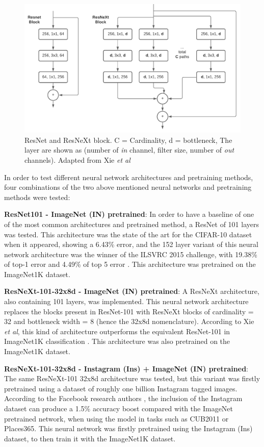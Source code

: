\documentclass[10pt,onecolumn,titlepage,letterpaper]{article}
\begin{document}
\begin{figure}[h]
	\begin{center}
		\includegraphics[width=0.75\linewidth]{resnet_resnext_block.pdf}
	\end{center}
	\caption{ResNet and ResNeXt block. C = Cardinality, d = bottleneck, The layer are shown as (number of \textit{in} channel, filter size, number of \textit{out} channels). Adapted from Xie \textit{et al} \cite{Xie2017}}
	\label{fig:resnet}
\end{figure}

In order to test different neural network architectures and pretraining methods, four combinations of the two above mentioned neural networks and pretraining methods were tested:

\textbf{ResNet101 - ImageNet (IN) pretrained}: In order to have a baseline of one of the most common architectures and pretrained method, a ResNet of 101 layers was tested. This architecture was the state of the art for the CIFAR-10 dataset when it appeared, showing a 6.43\% error, and the 152 layer variant of this neural network architecture was the winner of the ILSVRC 2015 challenge, with 19.38\% of top-1 error and 4.49\% of top 5 error \cite{He2016}. This architecture was pretrained on the ImageNet1K dataset.

\textbf{ResNeXt-101-32x8d - ImageNet (IN) pretrained}: A ResNeXt architecture, also containing 101 layers, was implemented. This neural network architecture replaces the blocks present in ResNet-101 with ResNeXt blocks of cardinality = 32 and bottleneck width = 8 (hence the 32x8d nomenclature). According to Xie \textit{et al}, this kind of architecture outperforms the equivalent ResNet-101 in ImageNet1K classification \cite{Xie2017}. This architecture was also pretrained on the ImageNet1K dataset.

\textbf{ResNeXt-101-32x8d - Instagram (Ins) + ImageNet (IN) pretrained}: The same ResNeXt-101 32x8d architecture was tested, but this variant was firstly pretrained using a dataset of roughly one billion Instagram tagged images. According to the Facebook research authors \cite{Mahajan2018}, the inclusion of the Instagram dataset can produce a 1.5\% accuracy boost compared with the ImageNet pretrained network, when using the model in tasks such as CUB2011 or Places365. This neural network was firstly pretrained using the Instagram (Ins) dataset, to then train it with the ImageNet1K dataset.
\end{document}

